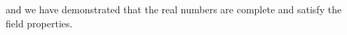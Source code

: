 \documentclass[preview]{standalone}
\begin{document}
\begin{center}
and we have demonstrated that the real numbers are complete and satisfy the field properties.
\end{center}
\end{document}

